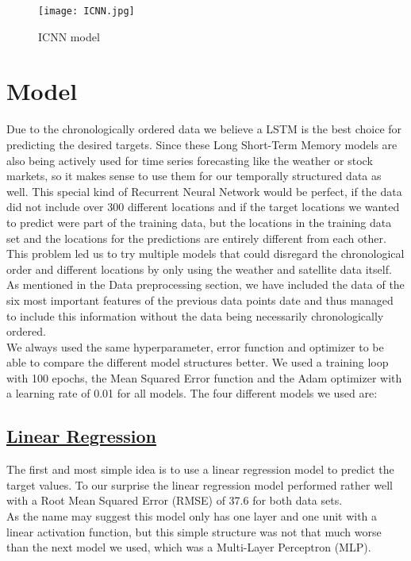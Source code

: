 \documentclass{article}
\begin{document}
\begin{figure}[htb!]
\centering
\texttt{[image: ICNN.jpg]}
\caption{ICNN model \citep{chae_pm10_2021}}
\label{fig:icnn}
\end{figure}
\section{Model}
Due to the chronologically ordered data we believe a LSTM is the best choice for predicting the desired targets. Since these Long Short-Term Memory models are also being actively used for time series forecasting like the weather or stock markets, so it makes sense to use them for our temporally structured data as well. This special kind of Recurrent Neural Network would be perfect, if the data did not include over 300 different locations and if the target locations we wanted to predict were part of the training data, but the locations in the training data set and the locations for the predictions are entirely different from each other. This problem led us to try multiple models that could disregard the chronological order and different locations by only using the weather and satellite data itself. As mentioned in the Data preprocessing section, we have included the data of the six most important features of the previous data points date and thus managed to include this information without the data being necessarily chronologically ordered. \\
We always used the same hyperparameter, error function and optimizer to be able to compare the different model structures better. We used a training loop with 100 epochs, the Mean Squared Error function and the Adam optimizer with a learning rate of 0.01 for all models.
The four different models we used are:
\subsection{\href{https://github.com/tjayada/iANNwTF_Project/blob/main/model/06_finished_linear_regression/06_finished_linear_regression(1).ipynb}{Linear Regression} }
The first and  most simple idea is to use a linear regression model to predict the target values. To our surprise the linear regression model performed rather well with a Root Mean Squared Error (RMSE) of 37.6 for both data sets. \\
As the name may suggest this model only has one layer and one unit with a linear activation function, but this simple structure was not that much worse than the next model we used, which was a Multi-Layer Perceptron (MLP).
\end{document}
